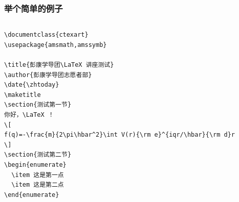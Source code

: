 \begin{frame}[fragile]
  \frametitle{举个简单的例子}
  \begin{columns}
    \begin{column}{0.48\textwidth}
      \scriptsize
      \begin{lstlisting}
\documentclass{ctexart}
\usepackage{amsmath,amssymb}

\title{彭康学导团\LaTeX 讲座测试}
\author{彭康学导团志愿者部}
\date{\zhtoday}
\maketitle
\section{测试第一节}
你好，\LaTeX ！
\[
f(q)=-\frac{m}{2\pi\hbar^2}\int V(r){\rm e}^{iqr/\hbar}{\rm d}r
\]
\section{测试第二节}
\begin{enumerate}
  \item 这是第一点
  \item 这是第二点
\end{enumerate}


\end{lstlisting}
\end{column}
\end{columns}
\end{frame}
